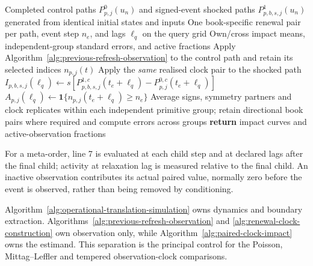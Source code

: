 \begin{algorithm}[H]
\caption{Common-input paired impact under an observation clock}
\label{alg:paired-clock-impact}
\begin{algorithmic}[1]
\Require Completed control paths $P_{p,j}^{0}(u_n)$ and signed-event shocked
paths $P_{p,b,s,j}^{1}(u_n)$ generated from identical initial states and inputs
\Require One book-specific renewal pair per path, event step $n_e$, and lags
$\ell_q$ on the query grid
\Ensure Own/cross impact means, independent-group standard errors, and active fractions
  \State Apply Algorithm~\ref{alg:previous-refresh-observation} to the control
  path and retain its selected indices $n_{p,j}(t)$
    \State Apply the \emph{same} realised clock pair to the shocked path
      \State $I_{p,b,s,j}(\ell_q)\gets s[P_{p,b,s,j}^{1,c}(t_e+\ell_q)
      -P_{p,j}^{0,c}(t_e+\ell_q)]$
      \State $A_{p,j}(\ell_q)\gets
      \mathbf 1\{n_{p,j}(t_e+\ell_q)\geq n_e\}$
    \EndFor
  \EndFor
\EndFor
\State Average signs, symmetry partners and clock replicates within each independent primitive group; retain directional book pairs where required and compute errors across groups
\State \textbf{return} impact curves and active-observation fractions
\end{algorithmic}
\end{algorithm}

For a meta-order, line 7 is evaluated at each child step and at declared lags
after the final child; activity at relaxation lag is measured relative to the
final child.  An inactive observation contributes its actual paired value,
normally zero before the event is observed, rather than being removed by
conditioning.

Algorithm~\ref{alg:operational-translation-simulation} owns dynamics and
boundary extraction.  Algorithms~\ref{alg:previous-refresh-observation} and
\ref{alg:renewal-clock-construction} own observation only, while
Algorithm~\ref{alg:paired-clock-impact} owns the estimand.  This separation is
the principal control for the Poisson, Mittag--Leffler and tempered
observation-clock comparisons.
